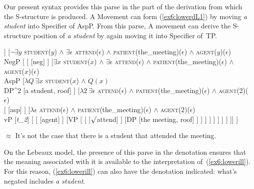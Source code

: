 Our present syntax provides this parse in the part of the derivation from which the S-structure is produced. A Movement can form (\ref{ex6:lowerdL1}) by moving \emph{a student} into Specifier of AspP. %
%
%
%
From this parse, A movement can derive the S-structure position of \emph{a student} by again moving it into Specifier of~TP.
\medskip
\begin{fullwidth}
\begin{exe}
\raggedright
	\ex \label{ex6:lowerdL1}
	\hspace*{-30pt}
	\footnotesize
	\begin{forest}
	[TP[\ibar{T}
		[\obar{T} [did]]
		[$\neg \exists y$ \textsc{student}($y$) $\wedge$ $\exists \epsilon$ \textsc{attend}($\epsilon$) $\wedge$ \textsc{patient}(the\_meeting)($\epsilon$) $\wedge$ \textsc{agent}($y$)($\epsilon$) \\NegP [
			[ [neg] ]
				[$\exists x$ \textsc{student}($x$) $\wedge$ $\exists \epsilon$ \textsc{attend}($\epsilon$) $\wedge$ \textsc{patient}(the\_meeting)($\epsilon$) $\wedge$ \textsc{agent}($x$)($\epsilon$)\\AspP 
				[$\lambda Q\ \exists x$ \textsc{student}($x$) $\wedge$ $Q(x)$\\DP^2 [a student, roof] ]
				[$\lambda 2\ \exists \epsilon$ \textsc{attend}($\epsilon$) $\wedge$ \textsc{patient}(the\_meeting)($\epsilon$) $\wedge$ \textsc{agent}($2$)($\epsilon$)\\
					[ [asp] ]
					[$\lambda \epsilon$ \textsc{attend}($\epsilon$) $\wedge$ \textsc{patient}(the\_meeting)($\epsilon$) $\wedge$ \textsc{agent}($2$)($\epsilon$)\\vP
						[{\emph{t_2}}]
						[
							[ [agent] ]
							[VP [
								[ [$\surd$attend] ]
								[DP [the meeting, roof] ]
							] ]
						 ]
					 ]
				] ]
			 ]
		]]
	]
	\end{forest}
	\normalsize
	\sn $\approx$ It's not the case that there is a student that attended the meeting.
\end{exe}	
\end{fullwidth}
\medskip
On the Lebeaux model, the presence of this parse in the denotation ensures that the meaning associated with it is available to the interpretation of~(\ref{ex6:lowerill}). For this reason, (\ref{ex6:lowerill}) can also have the denotation indicated: what's negated includes \emph{a student}.

